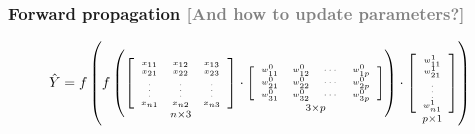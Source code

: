 \documentclass[xcolor={dvipsnames}]{beamer}
\begin{document}
\frame
{
 \frametitle{Forward propagation \textcolor{gray}{[And how to update parameters?]}}
 
$$\hat Y = \Huge f \tiny \left( \Huge f \tiny \left(\underset{n \times 3}{\left[\begin{array}{ccc} x_{11} & x_{12} & x_{13}\\x_{21} & x_{22} & x_{23}\\ \vdots&\vdots&\vdots\\x_{n1} & x_{n2} & x_{n3}\\ \end{array} \right]} \cdot  \underset{3 \times p}{\left[\begin{array}{cccc} w^0_{11} & w^0_{12} &\cdots &w^0_{1p}\\w^0_{21} & w^0_{22} &\cdots &w^0_{2p}\\w^0_{31} & w^0_{32} &\cdots &w^0_{3p}\\ \end{array} \right]}\right)   
\cdot \underset{p \times 1}{\left[\begin{array}{c} w^1_{11}\\w^1_{21}\\ \vdots\\w^1_{n1}\\ \end{array} \right]} \right)$$

}
\end{document}
